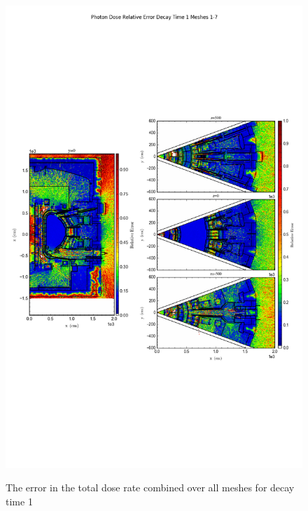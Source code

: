 \documentclass[12pt]{article}
\begin{document}
\begin{figure}[ht!]
\centering
\includegraphics[trim={0cm 9cm 0cm 10cm},clip,scale=0.75]{../plots/final_model/Photon_Dose_Relative_Error_Decay_Time_1_Meshes_1-7.png}
\label{fig:photons_dc1_no4bc_total_error}
\caption{The error in the total dose rate combined over all meshes for decay time 1}
\end{figure}
\end{document}
